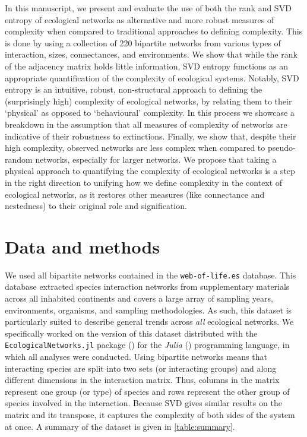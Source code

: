 \begin{refsection}
In this manuscript, we present and evaluate the use of both the rank and SVD
entropy of ecological networks as alternative and more robust measures of
complexity when compared to traditional approaches to defining complexity. This
is done by using a collection of 220 bipartite networks from various types of
interaction, sizes, connectances, and environments. We show that while the rank
of the adjacency matrix holds little information, SVD entropy functions as an
appropriate quantification of the complexity of ecological systems. Notably, SVD
entropy is an intuitive, robust, non-structural approach to defining the
(surprisingly high) complexity of ecological networks, by relating them to their
`physical' as opposed to `behavioural' complexity. In this process we showcase a
breakdown in the assumption that all measures of complexity of networks are
indicative of their robustness to extinctions. Finally, we show that, despite
their high complexity, observed networks are less complex when compared to
pseudo-random networks, especially for larger networks. We propose that taking a
physical approach to quantifying the complexity of ecological networks is a step
in the right direction to unifying how we define complexity in the context of
ecological networks, as it restores other measures (like connectance and
nestedness) to their original role and signification.

\section{Data and methods}\label{data-and-methods}

We used all bipartite networks contained in the \texttt{web-of-life.es}
database. This database extracted species interaction networks from
supplementary materials across all inhabited continents and covers a large array
of sampling years, environments, organisms, and sampling methodologies. As such,
this dataset is particularly suited to describe general trends across \emph{all}
ecological networks. We specifically worked on the version of this dataset
distributed with the \texttt{EcologicalNetworks.jl} package
(\cite{Poisot2019EcoJl}) for the \emph{Julia} (\cite{Bezanson2017Julia})
programming language, in which all analyses were conducted. Using bipartite
networks means that interacting species are split into two sets (or interacting
groups) and along different dimensions in the interaction matrix. Thus, columns
in the matrix represent one group (or type) of species and rows represent the
other group of species involved in the interaction. Because SVD gives similar
results on the matrix and its transpose, it captures the complexity of both
sides of the system at once. A summary of the dataset is given in
\autoref{table:summary}.


\end{refsection}

